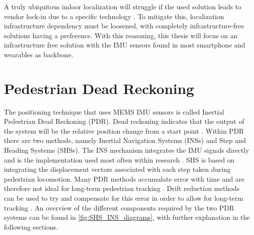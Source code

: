 A truly ubiquitous indoor localization will struggle if the used 
solution leads to vendor lock-in due to a specific technology \cite{Torok2014}. To mitigate this, localization infrastructure dependency must be loosened, with completely infrastructure-free solutions having a preference. With this reasoning, this thesis will focus on an infrastructure free solution with the IMU sensors found in most smartphone and wearables as backbone.


\section{Pedestrian Dead Reckoning}
The positioning technique that uses MEMS IMU sensors is called Inertial Pedestrian Dead Reckoning (PDR). Dead reckoning indicates that the output of the system will be the relative position change from a start point \cite{Yu2018}. Within PDR there are two methods, namely Inertial Navigation Systems (INSs) and Step and Heading Systems (SHSs). The INS mechanism integrates the IMU signals directly and is the implementation used most often within research \cite{Diez2018b}. SHS is based on integrating the displacement vectors associated with each step taken during pedestrian locomotion.  Many PDR methods accumulate error with time and are therefore not ideal for long-term pedestrian tracking \cite{Hardegger2012}. Drift reduction methods can be used to try and compensate for this error in order to allow for long-term tracking \cite{MunozDiaz2019a}.
An overview of the different components required by the two PDR systems can be found in \cref{fig:SHS_INS_diagrams}, with further explanation in the following sections.




